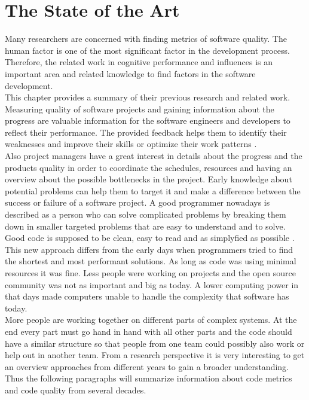 \chapter{The State of the Art}

Many researchers are concerned with finding metrics of software quality. The human factor is one of the most significant factor in the development process. Therefore, the related work in  cognitive performance and influences is an important area and related knowledge to find factors in the software development.\\
This chapter provides a summary of their previous research and related work.
\bigbreak
Measuring quality of software projects and gaining information about the progress are valuable information for the software engineers and developers to reflect their performance. The provided feedback helps them to identify their weaknesses and improve their skills or optimize their work patterns \cite{johnson1999leap} \cite{Martin:2008:CCH:1388398}.\\
Also project managers have a great interest in details about the progress and the products quality in order to coordinate the schedules, resources and having an overview about the possible bottlenecks in the project.
Early knowledge about potential problems can help them to target it and make a difference between the success or failure of a software project.
\bigbreak
A good programmer nowadays is described as a person who can solve complicated problems by breaking them down in smaller targeted problems that are easy to understand and to solve. 
\\
Good code is supposed to be clean, easy to read and as simplyfied as possible \cite{johnson1999leap}.
\\
This new approach differs from the early days when programmers tried to find the shortest and most performant solutions. As long as code was using minimal resources it was fine. Less people were working on projects and the open source community was not as important and big as today. A lower computing power in that days made computers unable to handle the complexity that software has today. \\
More people are working together on different parts of complex systems. At the end every part must go hand in hand with all other parts and the code should have a similar structure so that people from one team could possibly also work or help out in another team.
\bigbreak
From a research perspective it is very interesting to get an overview approaches from different years to gain a broader understanding. Thus the following paragraphs will summarize information about code metrics and code quality from several decades.

